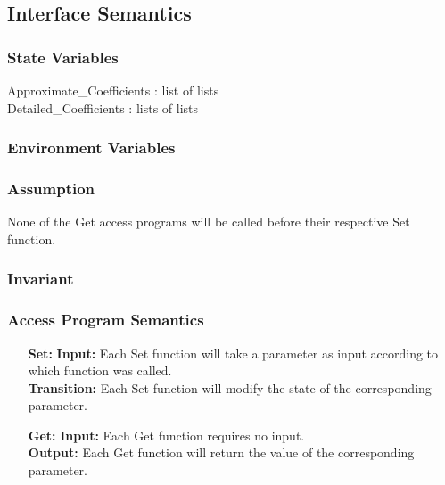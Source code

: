 \documentclass[12pt]{article}
\begin{document}
\subsection{Interface Semantics}
\subsubsection{State Variables}
Approximate\_Coefficients : list of lists\\
Detailed\_Coefficients : lists of lists
\subsubsection{Environment Variables}
\subsubsection{Assumption}
None of the Get access programs will be called before their respective
Set function.
\subsubsection{Invariant}
\subsubsection{Access Program Semantics}
\begin{itemize}

\item[\textbf{Set:}]
\textbf{Input:}
Each Set function will take a parameter as input according to which
function was called.\\
\textbf{Transition:}
Each Set function will modify the state of the corresponding parameter.
 
\item[\textbf{Get:}]
\textbf{Input:}
Each Get function requires no input.\\
\textbf{Output:}
Each Get function will return the value of the corresponding parameter.
 \end{itemize}
\end{document}
